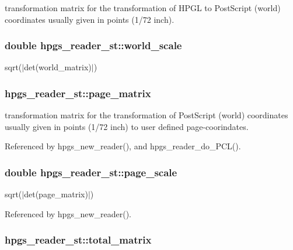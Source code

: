 transformation matrix for the transformation of HPGL to PostScript (world) coordinates usually given in points (1/72 inch). 
\subsubsection[world\_\-scale]{\setlength{\rightskip}{0pt plus 5cm}double {\bf hpgs\_\-reader\_\-st::world\_\-scale}}\label{structhpgs__reader__st_9c9337367da6b45d8723dda3b6b55929}


sqrt($|$det(world\_\-matrix)$|$) 
\subsubsection[page\_\-matrix]{ {\bf hpgs\_\-reader\_\-st::page\_\-matrix}}\label{structhpgs__reader__st_57eabb10e99d2b73f539d9d48f2e75e9}


transformation matrix for the transformation of PostScript (world) coordinates usually given in points (1/72 inch) to user defined page-coorindates. 

Referenced by hpgs\_\-new\_\-reader(), and hpgs\_\-reader\_\-do\_\-PCL().
\subsubsection[page\_\-scale]{\setlength{\rightskip}{0pt plus 5cm}double {\bf hpgs\_\-reader\_\-st::page\_\-scale}}\label{structhpgs__reader__st_4ed2af3b63c82fbeb325d400f51956a7}


sqrt($|$det(page\_\-matrix)$|$) 

Referenced by hpgs\_\-new\_\-reader().
\subsubsection[total\_\-matrix]{ {\bf hpgs\_\-reader\_\-st::total\_\-matrix}}\label{structhpgs__reader__st_f55190b7655794319d7674c364eeebaa}


